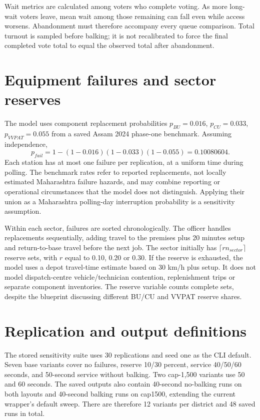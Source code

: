 \documentclass[11pt,a4paper,oneside]{report}
\newcommand{\source}[1]{\par\nopagebreak[4]{\footnotesize\color{teal}Evidence: #1.}\par}
\begin{document}
Wait metrics are calculated among voters who complete voting. As more long-wait voters leave, mean wait among those remaining can fall even while access worsens. Abandonment must therefore accompany every queue comparison. Total turnout is sampled before balking; it is not recalibrated to force the final completed vote total to equal the observed total after abandonment.
\source{[S11]}

\section{Equipment failures and sector reserves}
The model uses component replacement probabilities $p_{BU}=0.016$, $p_{CU}=0.033$, $p_{VVPAT}=0.055$ from a saved Assam 2024 phase-one benchmark. Assuming independence,
\begin{equation}
 p_{fail}=1-(1-0.016)(1-0.033)(1-0.055)=0.10080604.
\end{equation}
Each station has at most one failure per replication, at a uniform time during polling. The benchmark rates refer to reported replacements, not locally estimated Maharashtra failure hazards, and may combine reporting or operational circumstances that the model does not distinguish. Applying their union as a Maharashtra polling-day interruption probability is a sensitivity assumption.

Within each sector, failures are sorted chronologically. The officer handles replacements sequentially, adding travel to the premises plus 20 minutes setup and return-to-base travel before the next job. The sector initially has $\lceil r n_{sector}\rceil$ reserve sets, with $r$ equal to 0.10, 0.20 or 0.30. If the reserve is exhausted, the model uses a depot travel-time estimate based on 30 km/h plus setup. It does not model dispatch-centre vehicle/technician contention, replenishment trips or separate component inventories. The reserve variable counts complete sets, despite the blueprint discussing different BU/CU and VVPAT reserve shares.
\source{[S11], [S12]}

\section{Replication and output definitions}
The stored sensitivity suite uses 30 replications and seed one as the CLI default. Seven base variants cover no failures, reserve 10/30 percent, service 40/50/60 seconds, and 50-second service without balking. Two cap-1,500 variants use 50 and 60 seconds. The saved outputs also contain 40-second no-balking runs on both layouts and 40-second balking runs on cap1500, extending the current wrapper's default sweep. There are therefore 12 variants per district and 48 saved runs in total.
\end{document}
